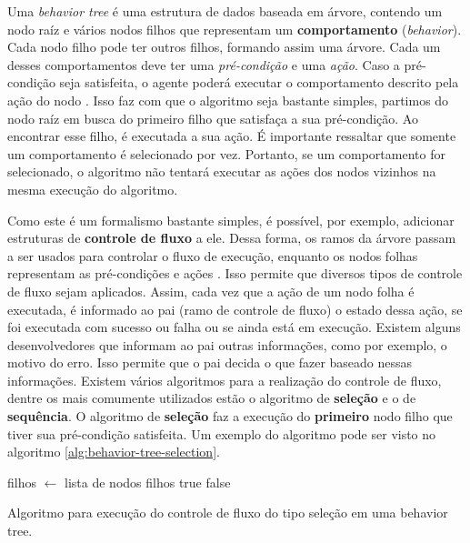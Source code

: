 Uma \textit{behavior tree} é uma estrutura de dados baseada em árvore, contendo
um nodo raíz e vários nodos filhos que representam um \textbf{comportamento}
(\textit{behavior}). Cada nodo filho pode ter outros filhos, formando assim uma
árvore. Cada um desses comportamentos deve ter uma \textit{pré-condição} e uma
\textit{ação}. Caso a pré-condição seja satisfeita, o agente poderá executar o
comportamento descrito pela ação do nodo \cite[Cap 4.]{Rabin:2013:GAP:2566761}.
Isso faz com que o algoritmo seja bastante simples, partimos do nodo raíz em
busca do primeiro filho que satisfaça a sua pré-condição. Ao encontrar esse
filho, é executada a sua ação. É importante ressaltar que somente um
comportamento é selecionado por vez. Portanto, se um comportamento for
selecionado, o algoritmo não tentará executar as ações dos nodos vizinhos na
mesma execução do algoritmo.

Como este é um formalismo bastante simples, é possível, por exemplo, adicionar
estruturas de \textbf{controle de fluxo} a ele. Dessa forma, os ramos da árvore
passam a ser usados para controlar o fluxo de execução, enquanto os nodos folhas
representam as pré-condições e ações \cite[Cap.  10]{Rabin:2015:GAP:2821138}.
Isso permite que diversos tipos de controle de fluxo sejam aplicados. Assim,
cada vez que a ação de um nodo folha é executada, é informado ao pai (ramo de
controle de fluxo) o estado dessa ação, se foi executada com sucesso ou falha ou
se ainda está em execução.  Existem alguns desenvolvedores que informam ao pai
outras informações, como por exemplo, o motivo do erro. Isso permite que o pai
decida o que fazer baseado nessas informações. Existem vários algoritmos para a
realização do controle de fluxo, dentre os mais comumente utilizados estão o
algoritmo de \textbf{seleção} e o de \textbf{sequência}. O algoritmo de
\textbf{seleção} faz a execução do \textbf{primeiro} nodo filho que tiver sua
pré-condição satisfeita. Um exemplo do algoritmo pode ser visto no algoritmo
\ref{alg:behavior-tree-selection}.

\begin{algorithm}[H]
\begin{center}
	\begin{algorithmic}[1]
        \STATE filhos $\gets$ lista de nodos filhos
                \RETURN true
            \ENDIF
        \ENDFOR
        \RETURN false
    \end{algorithmic}
\end{center}
\caption[Algoritmo para execução do controle de fluxo do tipo seleção em uma
behavior tree.]
{\label{alg:behavior-tree-selection} Algoritmo para execução do controle de
fluxo do tipo seleção em uma behavior tree.}
\end{algorithm}

